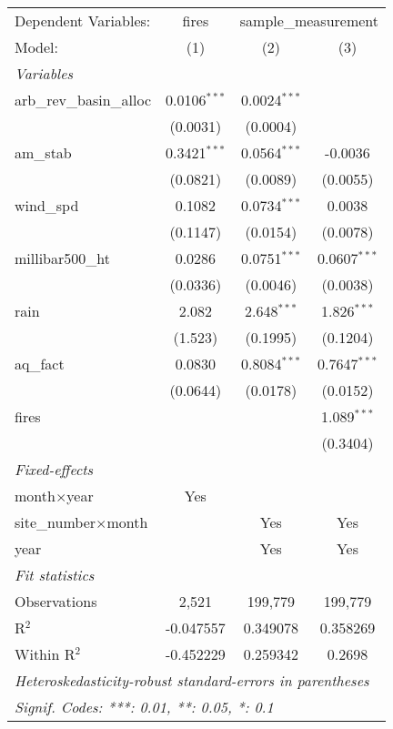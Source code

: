 \begin{tabular}{lccc}
\tabularnewline\midrule\midrule
Dependent Variables:&fires&\multicolumn{2}{c}{sample\_measurement}\\
Model:&(1) & (2) & (3)\\
\midrule \emph{Variables}&   &   &  \\
arb\_rev\_basin\_alloc&0.0106$^{***}$ & 0.0024$^{***}$ &   \\
  &(0.0031) & (0.0004) &   \\
am\_stab&0.3421$^{***}$ & 0.0564$^{***}$ & -0.0036\\
  &(0.0821) & (0.0089) & (0.0055)\\
wind\_spd&0.1082 & 0.0734$^{***}$ & 0.0038\\
  &(0.1147) & (0.0154) & (0.0078)\\
millibar500\_ht&0.0286 & 0.0751$^{***}$ & 0.0607$^{***}$\\
  &(0.0336) & (0.0046) & (0.0038)\\
rain&2.082 & 2.648$^{***}$ & 1.826$^{***}$\\
  &(1.523) & (0.1995) & (0.1204)\\
aq\_fact&0.0830 & 0.8084$^{***}$ & 0.7647$^{***}$\\
  &(0.0644) & (0.0178) & (0.0152)\\
fires&   &    & 1.089$^{***}$\\
  &   &    & (0.3404)\\
\midrule \emph{Fixed-effects}&   &   &  \\
month$\times$year & Yes &  & \\
site\_number$\times$month &  & Yes & Yes\\
year &  & Yes & Yes\\
\midrule \emph{Fit statistics}&  & & \\
Observations & 2,521&199,779&199,779\\
R$^2$ & -0.047557&0.349078&0.358269\\
Within R$^2$ & -0.452229&0.259342&0.2698\\
\midrule\midrule\multicolumn{4}{l}{\emph{Heteroskedasticity-robust standard-errors in parentheses}}\\
\multicolumn{4}{l}{\emph{Signif. Codes: ***: 0.01, **: 0.05, *: 0.1}}\\
\end{tabular}


